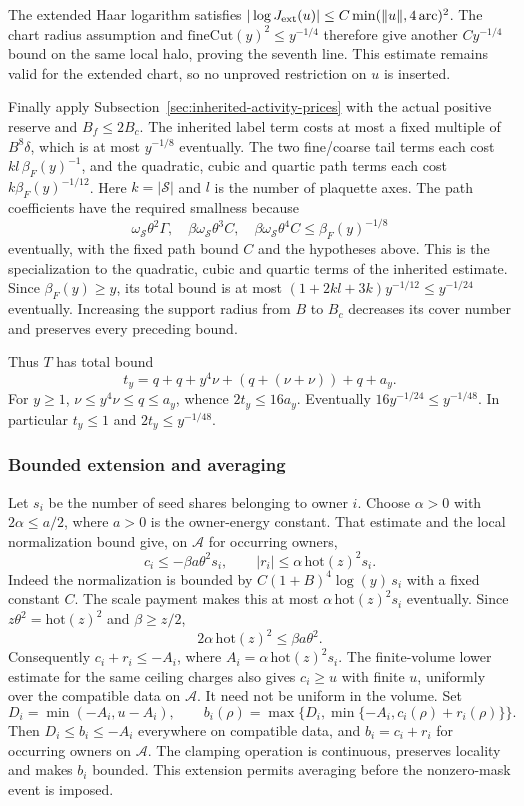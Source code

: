 The extended Haar logarithm satisfies
$|\log J_{\rm ext}(u)|\le C\min(\|u\|,4\,\mathrm{arc})^2$.
The chart radius assumption and
$\mathrm{fineCut}(y)^2\le y^{-1/4}$ therefore give another
$Cy^{-1/4}$ bound on the same local halo, proving the seventh
line. This estimate remains valid for the extended chart, so no
unproved restriction on $u$ is inserted.

Finally apply Subsection~\ref{sec:inherited-activity-prices} with
the actual positive reserve and $B_f\le2B_c$. The inherited
label term costs at most a fixed multiple of $B^8\delta$,
which is at most $y^{-1/8}$ eventually. The two fine/coarse
tail terms each cost $k l\,\beta_F(y)^{-1}$, and the
quadratic, cubic and quartic path terms each cost
$k\beta_F(y)^{-1/12}$. Here $k=|\mathcal S|$ and $l$ is the
number of plaquette axes. The path
coefficients have the required smallness because
\[
 \omega_{\mathcal S}\theta^2\Gamma,\quad
 \beta\omega_{\mathcal S}\theta^3 C,\quad
 \beta\omega_{\mathcal S}\theta^4 C
 \le \beta_F(y)^{-1/8}
\]
eventually, with the fixed path bound $C$ and the hypotheses
above. This is the specialization to the quadratic, cubic and quartic terms
of the inherited estimate. Since $\beta_F(y)\ge y$, its total
bound is at most
$(1+2kl+3k)y^{-1/12}\le y^{-1/24}$ eventually.
Increasing the support radius from $B$ to $B_c$ decreases its
cover number and preserves every preceding bound.

Thus $T$ has total bound
\begin{equation}\label{eq:actual-body-price-total}
 t_y=q+q+y^4\nu+(q+(\nu+\nu))+q+a_y.
\end{equation}
For $y\ge1$, $\nu\le y^4\nu\le q\le a_y$, whence
$2t_y\le16a_y$. Eventually $16y^{-1/24}\le y^{-1/48}$.
In particular $t_y\le1$ and $2t_y\le y^{-1/48}$.

\subsubsection{Bounded extension and averaging}

Let $s_i$ be the number of seed shares belonging to owner $i$.
Choose $\alpha>0$ with $2\alpha\le a/2$, where $a>0$
is the owner-energy constant. That estimate and the local
normalization bound give, on $\mathcal A$ for occurring owners,
\[
 c_i\le-\beta a\theta^2s_i,\qquad
 |r_i|\le\alpha\,\mathrm{hot}(z)^2s_i.
\]
Indeed the normalization is bounded by
$C(1+B)^4\log(y)\,s_i$ with a fixed constant $C$.
The scale payment makes this at most
$\alpha\,\mathrm{hot}(z)^2s_i$ eventually.
Since $z\theta^2=\mathrm{hot}(z)^2$ and $\beta\ge z/2$,
\[
 2\alpha\,\mathrm{hot}(z)^2\le\beta a\theta^2.
\]
Consequently $c_i+r_i\le-A_i$, where
$A_i=\alpha\,\mathrm{hot}(z)^2s_i$.
The finite-volume lower estimate for the same ceiling charges
also gives $c_i\ge u$ with finite $u$, uniformly over the
compatible data on $\mathcal A$. It need not be uniform in the
volume. Set
\[
 D_i=\min(-A_i,u-A_i),\qquad
 b_i(\rho)=\max\{D_i,\min\{-A_i,c_i(\rho)+r_i(\rho)\}\}.
\]
Then $D_i\le b_i\le-A_i$ everywhere on compatible data,
and $b_i=c_i+r_i$ for occurring owners on $\mathcal A$.
The clamping operation is continuous, preserves locality and
makes $b_i$ bounded. This extension permits averaging before
the nonzero-mask event is imposed.

